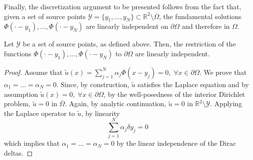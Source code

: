 Finally, the discretization argument to be presented follows from the fact that, given a set of source points \(\mathcal{Y} = \{y_1,\dots, y_N\} \subset \mathbb{R}^2\setminus\overline{\Omega}\), the fundamental solutions \(\Phi(\cdot-y_1),\dots,\Phi(\cdot-y_N)\) are linearly independent on \(\partial \Omega\) and therefore in \(\Omega\).
\begin{theorem}\label{lapl_li}
    Let \(\mathcal{Y}\) be a set of source points, as defined above. Then, the restriction of the functions \(\Phi(\cdot-y_1),\dots,\Phi(\cdot-y_N)\) to \(\partial\Omega\) are linearly independent.
\end{theorem}
\begin{proof}
    Assume that \(\tilde{u}(x) = \sum_{j=1}^{N}\alpha_j \Phi(x-y_j) = 0, \; \forall x \in \partial\Omega\). We prove that \(\alpha_1=\dots=\alpha_N = 0\). Since, by construction, \(\tilde{u}\) satisfies the Laplace equation and by assumption \(\tilde{u}(x) = 0, \; \forall x \in \partial\Omega\), by the well-posedness of the interior Dirichlet problem, \(\tilde{u} = 0\) in \(\overline{\Omega}\). Again, by analytic continuation, \(\tilde{u} = 0\) in \(\mathbb{R}^2\setminus\mathcal{Y}\). Applying the Laplace operator to \(\tilde{u}\), by linearity
    \[
        \sum_{j=1}^{N}\alpha_j \delta{y_j} = 0
    \]
    which implies that \(\alpha_1=\dots=\alpha_N = 0\) by the linear independence of the Dirac deltas.
\end{proof}

